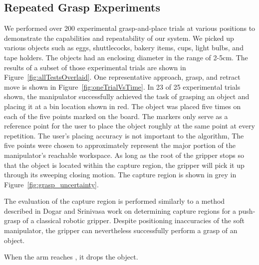 \subsection{Repeated Grasp Experiments}
We performed over 200 experimental grasp-and-place trials at various positions to demonstrate the capabilities and repeatability of our system.
We picked up various objects such as eggs, shuttlecocks, bakery items, cups, light bulbs, and tape holders. 
The objects had an enclosing diameter in the range of 2-5\unit{cm}. 
The results of a subset of those experimental trials are shown in Figure~\ref{fig:allTestsOverlaid}.
One representative approach, grasp, and retract move is shown in Figure~\ref{fig:oneTrialVsTime}.
In 23 of 25 experimental trials shown, the manipulator successfully achieved the task of grasping an object and placing it at a bin location shown in red.
The object was placed five times on each of the five points marked on the board.
The markers only serve as a reference point for the user to place the object roughly at the same point at every repetition.
The user's placing accuracy is not important to the algorithm, 
The five points were chosen to approximately represent the major portion of the manipulator's reachable workspace.
As long as the root of the gripper stops so that the object is located within the capture region, the gripper will pick it up through its sweeping closing motion. The capture region is shown in grey in Figure~\ref{fig:grasp_uncertainty}. 

The evaluation of the capture region is performed similarly to a method described in Dogar and Srinivasa\cite{dogar2010push} work on determining capture regions for a push-grasp of a classical robotic gripper.
Despite positioning inaccuracies of the soft manipulator, the gripper can nevertheless successfully perform a grasp of an object. 

When the arm reaches , it drops the object.

